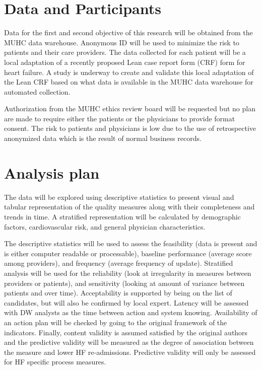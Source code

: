 \section{Data and Participants}
Data for the first and second objective of this research will be obtained from the MUHC data warehouse. Anonymous ID will be used to minimize the risk to patients and their care providers. The data collected for each patient will be a local adaptation of a recently proposed Lean case report form (\gls{CRF}) form for heart failure.\cite{psotka2019design} A study is underway to create and validate this local adaptation of the Lean CRF based on what data is available in the MUHC data warehouse for automated collection.

Authorization from the MUHC ethics review board will be requested but no plan are made to require either the patients or the physicians to provide format consent. The risk to patients and physicians is low due to the use of retrospective anonymized data which is the result of normal business records.

\section{Analysis plan}
The data will be explored using descriptive statistics to present visual and tabular representation of the quality measures along with their completeness and trends in time. A stratified representation will be calculated by demographic factors, cardiovascular risk, and general physician characteristics.

The descriptive statistics will be used to assess the feasibility (data is present and is either computer readable or processable), baseline performance (average score among providers), and frequency (average frequency of update). Stratified analysis will be used for the reliability (look at irregularity in measures between providers or patients), and sensitivity (looking at amount of variance between patients and over time). Acceptability is supported by being on the list of candidates, but will also be confirmed by local expert. Latency will be assessed with DW analysts as the time between action and system knowing. Availability of an action plan will be checked by going to the original framework of the indicators. Finally, content validity is assumed satisfied by the original authors and the predictive validity will be measured as the degree of association between the measure and lower HF re-admissions. Predictive validity will only be assessed for HF specific process measures.

